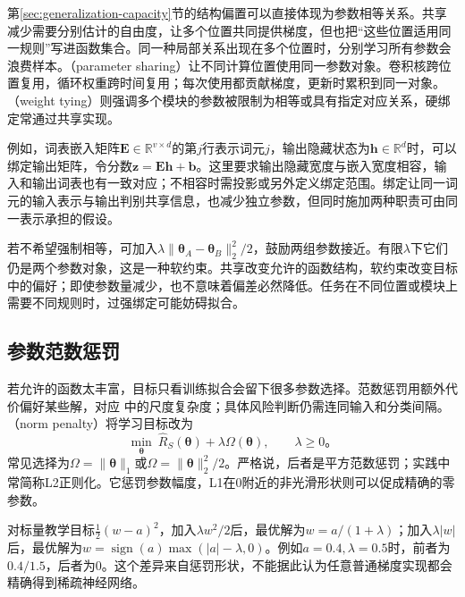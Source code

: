 第\ref{sec:generalization-capacity}节的结构偏置可以直接体现为参数相等关系。共享减少需要分别估计的自由度，让多个位置共同提供梯度，但也把“这些位置适用同一规则”写进函数集合。同一种局部关系出现在多个位置时，分别学习所有参数会浪费样本。（parameter sharing）让不同计算位置使用同一参数对象。卷积核跨位置复用，循环权重跨时间复用；每次使用都贡献梯度，更新时累积到同一对象。（weight tying）则强调多个模块的参数被限制为相等或具有指定对应关系，硬绑定常通过共享实现。

例如，词表嵌入矩阵$\bm E\in\mathbb R^{v\times d}$的第$j$行表示词元$j$，输出隐藏状态为$\bm h\in\mathbb R^d$时，可以绑定输出矩阵，令分数$\bm z=\bm E\bm h+\bm b$。这里要求输出隐藏宽度与嵌入宽度相容，输入和输出词表也有一致对应；不相容时需投影或另外定义绑定范围。绑定让同一词元的输入表示与输出判别共享信息，也减少独立参数，但同时施加两种职责可由同一表示承担的假设。

若不希望强制相等，可加入$\lambda\lVert\bm\theta_A-\bm\theta_B\rVert_2^2/2$，鼓励两组参数接近。有限$\lambda$下它们仍是两个参数对象，这是一种软约束。共享改变允许的函数结构，软约束改变目标中的偏好；即使参数量减少，也不意味着偏差必然降低。任务在不同位置或模块上需要不同规则时，过强绑定可能妨碍拟合。

\subsection{参数范数惩罚}
\label{sec:generalization-norm-penalties}

若允许的函数太丰富，目标只看训练拟合会留下很多参数选择。范数惩罚用额外代价偏好某些解，对应
中的尺度复杂度；具体风险判断仍需连同输入和分类间隔。（norm penalty）将学习目标改为
\begin{equation}
  \min_{\bm\theta}\ \hat R_S(\bm\theta)+\lambda\Omega(\bm\theta),
  \qquad\lambda\geq0\text{。}
  \label{eq:generalization-regularized-objective}
\end{equation}
常见选择为$\Omega=\lVert\bm\theta\rVert_1$或$\Omega=\lVert\bm\theta\rVert_2^2/2$。严格说，后者是平方范数惩罚；实践中常简称L2正则化。它惩罚参数幅度，L1在0附近的非光滑形状则可以促成精确的零参数。

\begin{example}[L1与L2的收缩不同]
  \label{ex:generalization-shrinkage}
  对标量教学目标$\tfrac12(w-a)^2$，加入$\lambda w^2/2$后，最优解为$w=a/(1+\lambda)$；加入$\lambda|w|$后，最优解为$w=\operatorname{sign}(a)\max(|a|-\lambda,0)$。例如$a=0.4,\lambda=0.5$时，前者为$0.4/1.5$，后者为0。这个差异来自惩罚形状，不能据此认为任意普通梯度实现都会精确得到稀疏神经网络。
\end{example}

